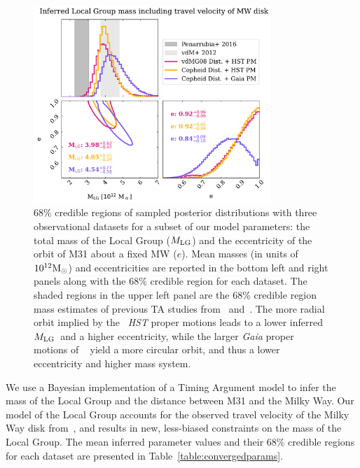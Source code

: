 \documentclass[twocolumn]{aastex631}
\newcommand{\mlg}{\ensuremath{M_{\rm LG}}}
\begin{document}
\begin{figure}[htb]
  \centering
  \includegraphics[width=0.8\textwidth]
  {analyze-runs-contour.pdf}
  \caption{\label{fig:contour} 68\% credible regions of sampled posterior
  distributions with three observational datasets for a subset of our model
  parameters: the total mass of the Local Group (\mlg)
  and the eccentricity of the orbit of M31 about a fixed MW ($e$).
  Mean masses (in units of $10^{12}\mathrm{M}_\odot$) and eccentricities are reported in
  the bottom left and right panels along with the 68\% credible region for each
  dataset.
  The shaded regions in the upper left panel are the 68\% credible region mass
  estimates of previous TA studies from~\cite{vdm2012}
  and~\cite{Penarrubia2016}.
  The more radial orbit implied by the~\cite{vdm2012} \textit{HST} proper
  motions leads to a lower inferred \mlg\ and a higher
  eccentricity, while the larger \textit{Gaia} proper motions of
  ~\cite{Salomon2021} yield a more circular orbit, and thus a lower eccentricity
   and higher mass system.
   }
\end{figure}

We use a Bayesian implementation of a Timing Argument model to infer the mass of
the Local Group and the distance between M31 and the Milky Way.
Our model of the Local Group accounts for the observed travel velocity of
the Milky Way disk from~\cite{Petersen2021}, and results in new,
less-biased constraints on the mass of the Local Group.
The mean inferred parameter values and their 68\% credible regions for each
dataset are presented in Table~\ref{table:convergedparams}.
\end{document}
